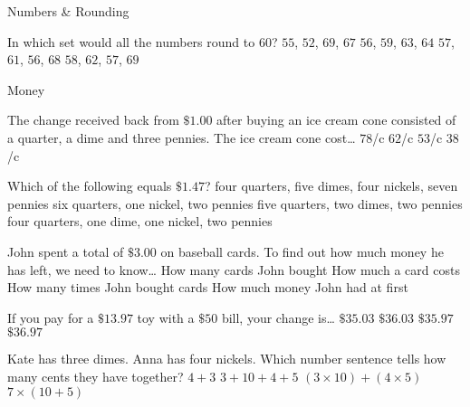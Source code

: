 \documentclass{jj_game} %
\def\cents{\hbox{\rm\rlap/c}}
\begin{document}
\begin{Questions}
\begin{Category}{Numbers \& Rounding}
\begin{Question}

In which set would all the numbers round to $60$?
 $55$, $52$, $69$, $67$
 $56$, $59$, $63$, $64$
 $57$, $61$, $56$, $68$
 $58$, $62$, $57$, $69$
\end{Question}

\end{Category}

\begin{Category}{Money}

\begin{Question}

The change received back from $\$1.00$ after buying an ice cream
cone consisted of a quarter, a dime and three pennies.  The ice
cream cone cost\dots
{} $78$\cents
{} $62$\cents
{} $53$\cents
{} $38$\cents
\end{Question}

\begin{Question}

Which of the following equals $\$1.47$?
 four quarters, five dimes, four nickels, seven pennies
 six quarters, one nickel, two pennies
 five quarters, two dimes, two pennies
 four quarters, one dime, one nickel, two pennies
\end{Question}

\begin{Question}

John spent a total of $\$3.00$ on baseball cards.  To find out
how much money he has left, we need to know\dots
{} How many cards John bought
 How much a card costs
 How many times John bought cards
 How much money John had at first
\end{Question}

\begin{Question}

If you pay for a $\$13.97$ toy with a $\$50$ bill, your change
is\dots
{} $\$35.03$
 $\$36.03$
 $\$35.97$
 $\$36.97$
\end{Question}

\begin{Question}

Kate has three dimes.  Anna has four nickels.  Which number sentence tells
how many cents they have together?
 $4+3$
 $3+10+4+5$
 $(3\times 10)+(4\times 5)$
 $7\times(10+5)$
\end{Question}

\end{Category}

\end{Questions}
\end{document}
